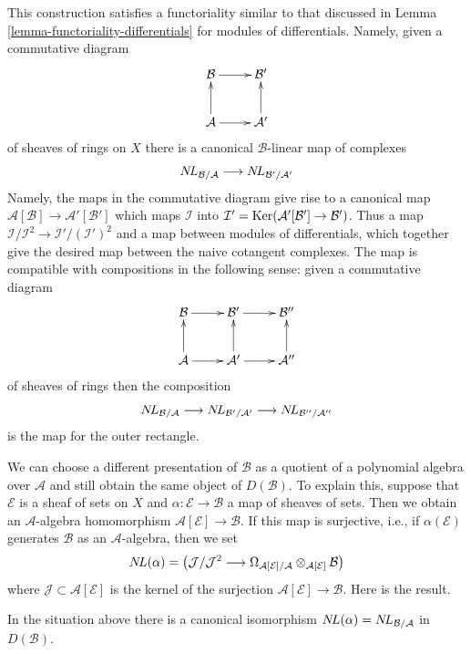 \noindent
This construction satisfies a functoriality similar to that discussed
in Lemma \ref{lemma-functoriality-differentials} for modules of differentials.
Namely, given a commutative diagram
\begin{equation}
\label{equation-commutative-square-sheaves}
\vcenter{
\xymatrix{
\mathcal{B} \ar[r] & \mathcal{B}' \\
\mathcal{A} \ar[u] \ar[r] & \mathcal{A}' \ar[u]
}
}
\end{equation}
of sheaves of rings on $X$ there is a canonical
$\mathcal{B}$-linear map of complexes
$$
\mathop{N\!L}\nolimits_{\mathcal{B}/\mathcal{A}} \longrightarrow \mathop{N\!L}\nolimits_{\mathcal{B}'/\mathcal{A}'}
$$
Namely, the maps in the commutative diagram give rise to a canonical map
$\mathcal{A}[\mathcal{B}] \to \mathcal{A}'[\mathcal{B}']$
which maps $\mathcal{I}$ into
$\mathcal{I}' = \mathop{\mathrm{Ker}}(\mathcal{A}'[\mathcal{B}'] \to \mathcal{B}')$.
Thus a map $\mathcal{I}/\mathcal{I}^2 \to \mathcal{I}'/(\mathcal{I}')^2$
and a map between modules of differentials, which together give the
desired map between the naive cotangent complexes.
The map is compatible with compositions in the following sense:
given a commutative diagram
$$
\xymatrix{
\mathcal{B} \ar[r] &
\mathcal{B}' \ar[r] &
\mathcal{B}'' \\
\mathcal{A} \ar[u] \ar[r] &
\mathcal{A}' \ar[u] \ar[r] &
\mathcal{A}'' \ar[u]
}
$$
of sheaves of rings then the composition
$$
\mathop{N\!L}\nolimits_{\mathcal{B}/\mathcal{A}} \longrightarrow
\mathop{N\!L}\nolimits_{\mathcal{B}'/\mathcal{A}'} \longrightarrow
\mathop{N\!L}\nolimits_{\mathcal{B}''/\mathcal{A}''}
$$
is the map for the outer rectangle.

\medskip\noindent
We can choose a different presentation of $\mathcal{B}$ as a quotient of a
polynomial algebra over $\mathcal{A}$ and still obtain the same object
of $D(\mathcal{B})$. To explain this, suppose that $\mathcal{E}$ is
a sheaf of sets on $X$ and $\alpha : \mathcal{E} \to \mathcal{B}$
a map of sheaves of sets. Then we obtain an $\mathcal{A}$-algebra
homomorphism $\mathcal{A}[\mathcal{E}] \to \mathcal{B}$. If this map
is surjective, i.e., if $\alpha(\mathcal{E})$ generates $\mathcal{B}$
as an $\mathcal{A}$-algebra, then we set
$$
\mathop{N\!L}\nolimits(\alpha) = \left(
\mathcal{J}/\mathcal{J}^2
\longrightarrow
\Omega_{\mathcal{A}[\mathcal{E}]/\mathcal{A}}
\otimes_{\mathcal{A}[\mathcal{E}]} \mathcal{B}\right)
$$
where $\mathcal{J} \subset \mathcal{A}[\mathcal{E}]$ is the kernel
of the surjection $\mathcal{A}[\mathcal{E}] \to \mathcal{B}$.
Here is the result.

\begin{lemma}
\label{lemma-NL-up-to-qis}
In the situation above there is a canonical isomorphism
$\mathop{N\!L}\nolimits(\alpha) = \mathop{N\!L}\nolimits_{\mathcal{B}/\mathcal{A}}$ in $D(\mathcal{B})$.
\end{lemma}

